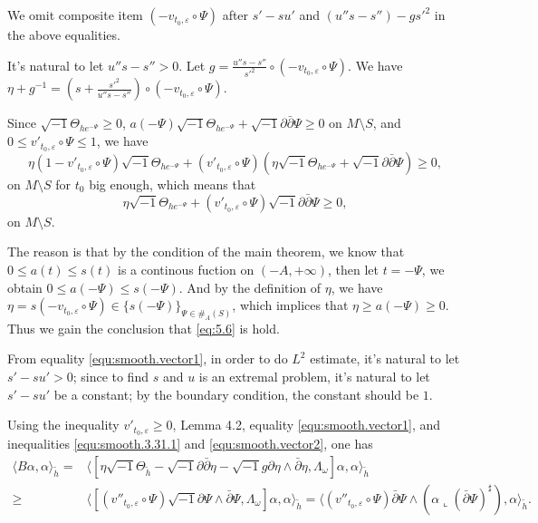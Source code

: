 We omit composite item $(-v_{t_0,\varepsilon}\circ \Psi)$ after $s'-su'$ and $(u''s-s'')-gs'^{2}$
in the above equalities.

It's natural to let $u''s-s''>0$. Let
$g=\frac{u''s-s''}{s'^{2}}\circ(-v_{t_0,\varepsilon}\circ \Psi)$. We
have
$\eta+g^{-1}=(s+\frac{s'^{2}}{u''s-s''})\circ(-v_{t_0,\varepsilon}\circ
\Psi)$.

Since $\sqrt{-1}\Theta_{he^{-\Psi}}\geq0$,
$a(-\Psi)\sqrt{-1}\Theta_{he^{-\Psi}}+\sqrt{-1}\partial\bar\partial\Psi\geq0$
on $M\setminus S$, and $0\leq v'_{t_{0},\varepsilon}\circ\Psi\leq1$,
we have
\begin{equation}\label{eq:5.6}
\eta(1-v'_{t_0,\varepsilon}\circ\Psi)\sqrt{-1}\Theta_{he^{-\Psi}}+
(v'_{t_0,\varepsilon}\circ\Psi)(\eta\sqrt{-1}\Theta_{he^{-\Psi}}+\sqrt{-1}\partial\bar\partial\Psi)\geq 0,
\end{equation}
on $M\setminus S$ for $t_{0}$ big enough, which means that
\begin{equation}
\label{equ:smooth.vector2}
\eta\sqrt{-1}\Theta_{he^{-\Psi}}+(v'_{t_0,\varepsilon}\circ\Psi)\sqrt{-1}\partial\bar{\partial}\Psi\geq 0,
\end{equation}
on $M\setminus S$.
\begin{remark}
  The reason is that by the condition of the main theorem, we know that $0\leqslant a(t)\leqslant s(t)$ is a continous fuction on $(-A,+\infty)$, then let $t=-\Psi$, we obtain $0\leqslant a(-\Psi)\leqslant s(-\Psi)$. And by the definition of $\eta$, we have $\eta=s(-v_{t_0,\varepsilon}\circ \Psi)\in \{s(-\Psi)\}_{\Psi\in \#_A(S)}$, which implices that $\eta \geqslant a(-\Psi)\geqslant 0$. Thus we gain the conclusion that \ref{eq:5.6} is hold.
\end{remark}


From equality  \ref{equ:smooth.vector1}, in order to do $L^2$
estimate, it's natural to let $s'-su'>0$; since to find $s$ and $u$
is an extremal problem, it's natural to let $s'-su'$ be a constant;
by the boundary condition, the constant should be $1$.

Using the inequality $v'_{t_0,\varepsilon}\geq 0$, Lemma
4.2, equality \ref{equ:smooth.vector1}, and inequalities
\ref{equ:smooth.3.31.1} and \ref{equ:smooth.vector2}, one has
\begin{equation}
\label{equ:smooth.vector3}
\begin{split}
\langle B\alpha, \alpha\rangle_{\tilde{h}}=
&\langle[\eta\sqrt{-1}\Theta_{\tilde{h}}-\sqrt{-1}\partial\bar\partial\eta-\sqrt{-1}g
\partial\eta\wedge\bar\partial\eta,\Lambda_{\omega}]
\alpha,\alpha\rangle_{\tilde{h}}
\\\geq&
\langle[(v''_{t_0,\varepsilon}\circ \Psi)\sqrt{-1}\partial\Psi\wedge\bar{\partial}
\Psi,\Lambda_{\omega}]\alpha,\alpha\rangle_{\tilde{h}}
=\langle (v''_{t_{0},\varepsilon}\circ \Psi)
\bar\partial\Psi\wedge (\alpha\llcorner(\bar\partial\Psi)^\sharp),\alpha\rangle_{\tilde{h}}.
\end{split}
\end{equation}

